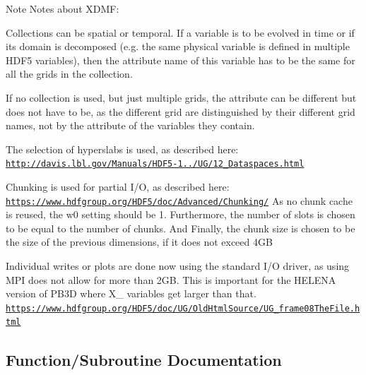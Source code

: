 \begin{DoxyNote}{Note}
Notes about X\+D\+MF\+:
\begin{DoxyItemize}
\item Collections can be spatial or temporal. If a variable is to be evolved in time or if its domain is decomposed (e.\+g. the same physical variable is defined in multiple H\+D\+F5 variables), then the attribute name of this variable has to be the same for all the grids in the collection.
\item If no collection is used, but just multiple grids, the attribute can be different but does not have to be, as the different grid are distinguished by their different grid names, not by the attribute of the variables they contain.
\item The selection of hyperslabs is used, as described here\+: \href{http://davis.lbl.gov/Manuals/HDF5-1.8.7/UG/12_Dataspaces.html}{\tt http\+://davis.\+lbl.\+gov/\+Manuals/\+H\+D\+F5-\/1../\+U\+G/12\+\_\+\+Dataspaces.\+html}
\item Chunking is used for partial I/O, as described here\+: \href{https://www.hdfgroup.org/HDF5/doc/Advanced/Chunking/}{\tt https\+://www.\+hdfgroup.\+org/\+H\+D\+F5/doc/\+Advanced/\+Chunking/} As no chunk cache is reused, the w0 setting should be 1. Furthermore, the number of slots is chosen to be equal to the number of chunks. And Finally, the chunk size is chosen to be the size of the previous dimensions, if it does not exceed 4\+GB
\item Individual writes or plots are done now using the standard I/O driver, as using M\+PI does not allow for more than 2\+GB. This is important for the H\+E\+L\+E\+NA version of P\+B3D where {\ttfamily X\+\_} variables get larger than that. \href{https://www.hdfgroup.org/HDF5/doc/UG/OldHtmlSource/UG_frame08TheFile.html}{\tt https\+://www.\+hdfgroup.\+org/\+H\+D\+F5/doc/\+U\+G/\+Old\+Html\+Source/\+U\+G\+\_\+frame08\+The\+File.\+html} 
\end{DoxyItemize}
\end{DoxyNote}


\subsection{Function/\+Subroutine Documentation}
\mbox{\label{namespacehdf5__ops_ade36dbd73b60da30e33a1059e590f734}} 

